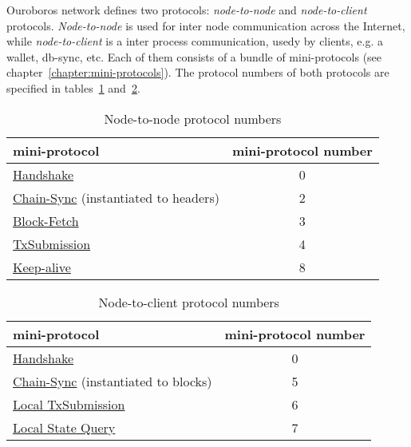 Ouroboros network defines two protocols: \emph{node-to-node} and
\emph{node-to-client} protocols.  \emph{Node-to-node} is used for inter node
communication across the Internet, while \emph{node-to-client} is a inter
process communication, usedy by clients, e.g. a wallet, db-sync, etc.  Each of them consists of a bundle of mini-protocols (see chapter~\ref{chapter:mini-protocols}).
The protocol numbers of both protocols
are specified in tables~\ref{table:node-to-node-protocol-numbers}
and~\ref{table:node-to-client-protocol-numbers}.
\begin{table}[ht]
  \begin{center}
    \begin{tabular}{l|c}
      mini-protocol                                                      & mini-protocol number \\\hline
      \hyperref[handshake-protocol]{Handshake}                           & 0  \\
      \hyperref[chain-sync-protocol]{Chain-Sync} \small{(instantiated to headers)} & 2  \\
      \hyperref[block-fetch-protocol]{Block-Fetch}                       & 3  \\
      \hyperref[tx-submission-protocol]{TxSubmission}                    & 4  \\
      \hyperref[keep-alive-protocol]{Keep-alive}                         & 8  \\
    \end{tabular}
  \end{center}
  \caption{Node-to-node protocol numbers}
  \label{table:node-to-node-protocol-numbers}
\end{table}
\begin{table}[ht]
  \begin{center}
    \begin{tabular}{l|c}
      mini-protocol                                                     & mini-protocol number \\\hline
      \hyperref[handshake-protocol]{Handshake}                          & 0 \\
      \hyperref[chain-sync-protocol]{Chain-Sync} \small{(instantiated to blocks)} & 5 \\
      \hyperref[local-tx-submission-protocol]{Local TxSubmission}       & 6 \\
      \hyperref[local-state-query-protocol]{Local State Query}          & 7 \\
    \end{tabular}
  \end{center}
  \caption{Node-to-client protocol numbers}
  \label{table:node-to-client-protocol-numbers}
\end{table}
